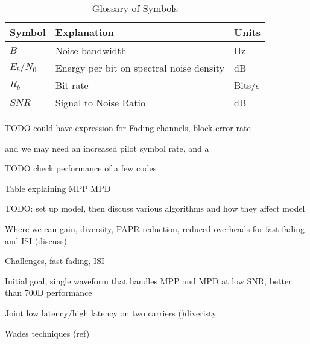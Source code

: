 \documentclass{article}
\begin{document}
\begin{table}[h]
\centering
\begin{tabular}{l l l}
 \hline
 Symbol & Explanation & Units \\
 \hline
 $B$ & Noise bandwidth & Hz \\
 $E_b/N_0$ &  Energy per bit on spectral noise density & dB \\
 $R_b$ & Bit rate & Bits/s \\
 $SNR$ & Signal to Noise Ratio & dB \\
 \hline
\end{tabular}
\caption{Glossary of Symbols}
\end{table}

TODO could have expression for Fading channels, block error rate

 and we may need an increased pilot symbol rate, and a 

TODO check performance of a few codes

Table explaining MPP MPD

TODO: set up model, then discuss various algorithms and how they affect model

Where we can gain, diversity, PAPR reduction, reduced overheads for fast fading and ISI (discuss)

Challenges, fast fading, ISI

Initial goal, single waveform that handles MPP and MPD at low SNR, better than 700D performance

Joint low latency/high latency on two carriers ()diveristy

Wades techniques (ref)



\end{document}
